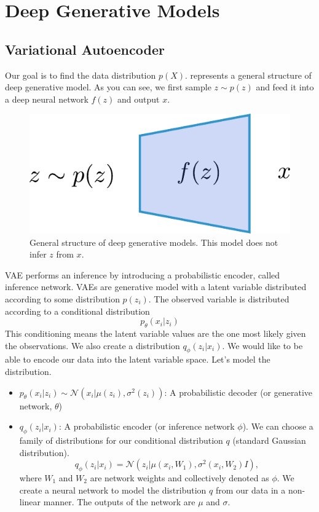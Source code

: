 \chapter{Deep Generative Models}
\section{Variational Autoencoder}

Our goal is to find the data distribution $p(X)$.  represents a general structure of deep generative model. As you can see, we first sample $z\sim p(z)$ and feed it into a deep neural network $f(z)$ and output $x$.

\begin{figure}[h]
	\begin{center}
		\includegraphics[scale=0.5]{./images/dgm.pdf}
	\end{center}
	\caption{General structure of deep generative models. This model does not infer $z$ from $x$.}
	\label{fig:dgm}
\end{figure}

VAE performs an inference by introducing a probabilistic encoder, called inference network. VAEs are generative model with a latent variable distributed according to some distribution $p(z_i)$. The observed variable is distributed according to a conditional distribution 
$$p_\theta(x_i|z_i)$$
This conditioning means the latent variable values are the one most likely given the observations. We also create a distribution $q_\phi(z_i|x_i)$. We would like to be able to encode our data into the latent variable space. Let's model the distribution.

\begin{itemize}
	\item $p_\theta(x_i|z_i)\sim \mathcal{N}(x_{i}|\mu(z_i), \sigma^2(z_i))$: A probabilistic decoder (or generative network, $\theta$)
	\item $q_\phi(z_i|x_i)$: A probabilistic encoder (or inference network $\phi$). We can choose a family of distributions for our conditional distribution $q$ (\eg standard Gaussian distribution). 
		$$q_\phi(z_i|x_i) = \mathcal{N}(z_i|\mu(x_i, W_1), \sigma^2(x_i, W_2)I),$$
	where $W_1$ and $W_2$ are network weights and collectively denoted as $\phi$. We create a neural network to model the distribution $q$ from our data in a non-linear manner. The outputs of the network are $\mu$ and $\sigma$. 
\end{itemize}

